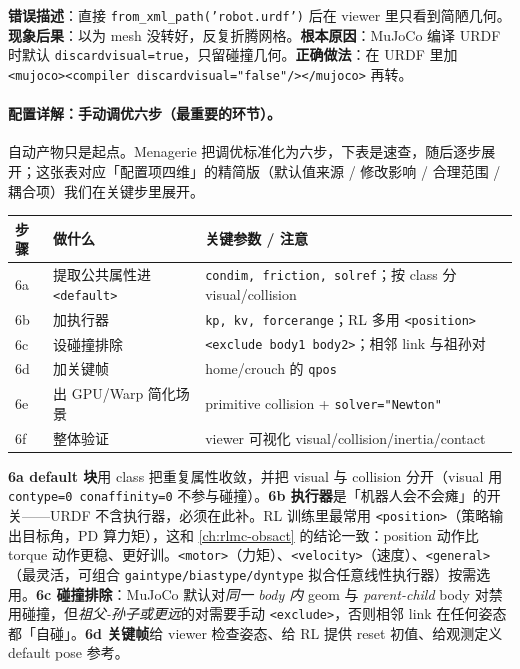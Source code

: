 \begin{pitfall}
\textbf{错误描述}：直接 \texttt{from\_xml\_path('robot.urdf')} 后在 viewer 里只看到简陋几何。\textbf{现象后果}：以为 mesh 没转好，反复折腾网格。\textbf{根本原因}：MuJoCo 编译 URDF 时默认 \texttt{discardvisual=true}，只留碰撞几何。\textbf{正确做法}：在 URDF 里加 \texttt{<mujoco><compiler discardvisual="false"/></mujoco>} 再转。
\end{pitfall}

\paragraph{配置详解：手动调优六步（最重要的环节）。}自动产物只是起点。Menagerie 把调优标准化为六步，下表是速查，随后逐步展开；这张表对应「配置项四维」的精简版（默认值来源 / 修改影响 / 合理范围 / 耦合项）我们在关键步里展开。

\begin{center}
\small
\begin{tabular}{@{}llp{4.6cm}@{}}
\toprule
步骤 & 做什么 & 关键参数 / 注意 \\
\midrule
6a & 提取公共属性进 \texttt{<default>} & \texttt{condim, friction, solref}；按 class 分 visual/collision \\
6b & 加执行器 & \texttt{kp, kv, forcerange}；RL 多用 \texttt{<position>} \\
6c & 设碰撞排除 & \texttt{<exclude body1 body2>}；相邻 link 与祖孙对 \\
6d & 加关键帧 & home/crouch 的 \texttt{qpos} \\
6e & 出 GPU/Warp 简化场景 & primitive collision + \texttt{solver="Newton"} \\
6f & 整体验证 & viewer 可视化 visual/collision/inertia/contact \\
\bottomrule
\end{tabular}
\end{center}

\textbf{6a default 块}用 class 把重复属性收敛，并把 visual 与 collision 分开（visual 用 \texttt{contype=0 conaffinity=0} 不参与碰撞）。\textbf{6b 执行器}是「机器人会不会瘫」的开关——URDF 不含执行器，必须在此补。RL 训练里最常用 \texttt{<position>}（策略输出目标角，PD 算力矩），这和 \cref{ch:rlmc-obsact} 的结论一致：position 动作比 torque 动作更稳、更好训。\texttt{<motor>}（力矩）、\texttt{<velocity>}（速度）、\texttt{<general>}（最灵活，可组合 \texttt{gaintype/biastype/dyntype} 拟合任意线性执行器）按需选用。\textbf{6c 碰撞排除}：MuJoCo 默认对\emph{同一 body 内} geom 与 \emph{parent-child} body 对禁用碰撞，但\emph{祖父-孙子或更远}的对需要手动 \texttt{<exclude>}，否则相邻 link 在任何姿态都「自碰」。\textbf{6d 关键帧}给 viewer 检查姿态、给 RL 提供 reset 初值、给观测定义 default pose 参考。

